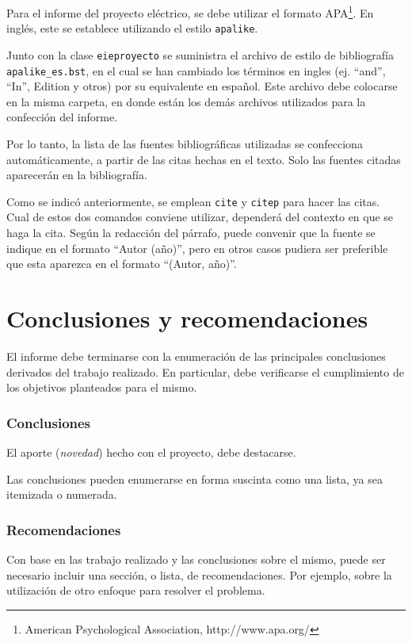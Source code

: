Para el informe del proyecto eléctrico, se debe utilizar el formato APA\footnote{American Psychological Association, http://www.apa.org/}.  En inglés, este se establece utilizando el estilo \texttt{apalike}.  

Junto con la clase \texttt{eieproyecto} se suministra el archivo de estilo de bibliografía \texttt{apalike\_es.bst}, en el cual se han cambiado los términos en ingles (ej. ``and'', ``In'', Edition y otros) por su equivalente en español.  Este archivo debe colocarse en la misma carpeta, en donde están los demás archivos utilizados para la confección del informe.

Por lo tanto, la lista de las fuentes bibliográficas utilizadas se confecciona automáticamente, a partir de las citas hechas en el texto.  Solo las fuentes citadas aparecerán en la bibliografía.

Como se indicó anteriormente, se emplean \texttt{cite} y \texttt{citep} para hacer las citas.  Cual de estos dos comandos conviene utilizar, dependerá del contexto en que se haga la cita.  Según la redacción del párrafo, puede convenir que la fuente se indique en el formato ``Autor (año)'', pero en otros casos pudiera ser preferible que esta aparezca en el formato ``(Autor, año)''.

\chapter{Conclusiones y recomendaciones}
El informe debe terminarse con la enumeración de las principales conclusiones derivados del trabajo realizado.  En particular, debe verificarse el cumplimiento de los objetivos planteados para el mismo.

\subsection{Conclusiones}
El aporte (\emph{novedad}) hecho con el proyecto, debe destacarse.

Las conclusiones pueden enumerarse en forma suscinta como una lista, ya sea itemizada o numerada.

\subsection{Recomendaciones}
Con base en las trabajo realizado y las conclusiones sobre el mismo, puede ser necesario incluir una sección, o lista, de recomendaciones.  Por ejemplo, sobre la utilización de otro enfoque para resolver el problema.
